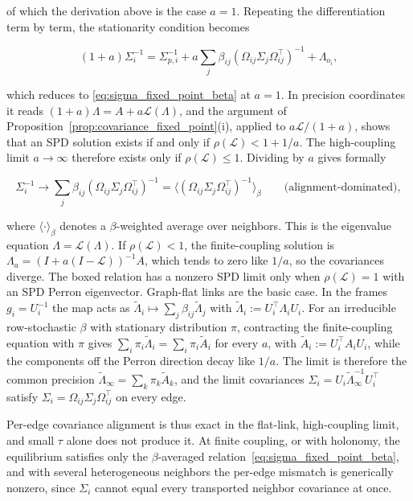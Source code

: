 \documentclass[11pt]{article}
\begin{document}
of which the derivation above is the case $a = 1$. Repeating the differentiation term by term, the stationarity condition becomes

\begin{equation}
(1 + a)\Sigma_i^{-1}
=\Sigma_{p,i}^{-1}
+ a \sum_j \beta_{ij}
(\Omega_{ij}\Sigma_j\Omega_{ij}^\top)^{-1}
+ \Lambda_{o_i},
\end{equation}

which reduces to \eqref{eq:sigma_fixed_point_beta} at $a = 1$. In precision coordinates it reads $(1+a)\Lambda = A + a\mathcal{L}(\Lambda)$, and the argument of Proposition~\ref{prop:covariance_fixed_point}(i), applied to $a\mathcal{L}/(1+a)$, shows that an SPD solution exists if and only if $\rho(\mathcal{L}) < 1 + 1/a$. The high-coupling limit $a \to \infty$ therefore exists only if $\rho(\mathcal{L}) \leq 1$. Dividing by $a$ gives formally

\begin{equation}
\boxed{
\Sigma_i^{-1}
\longrightarrow
\sum_j \beta_{ij}
(\Omega_{ij}\Sigma_j\Omega_{ij}^\top)^{-1}
=\big\langle(\Omega_{ij}\Sigma_j\Omega_{ij}^\top)^{-1}
\big\rangle_{\beta}
\qquad \text{(alignment-dominated)},}
\label{eq:beta_weighted_precision}
\end{equation}

where $\langle \cdot \rangle_{\beta}$ denotes a $\beta$-weighted average over neighbors. This is the eigenvalue equation $\Lambda = \mathcal{L}(\Lambda)$. If $\rho(\mathcal{L}) < 1$, the finite-coupling solution is $\Lambda_a = (I + a(I - \mathcal{L}))^{-1}A$, which tends to zero like $1/a$, so the covariances diverge. The boxed relation has a nonzero SPD limit only when $\rho(\mathcal{L}) = 1$ with an SPD Perron eigenvector. Graph-flat links are the basic case. In the frames $g_i = U_i^{-1}$ the map acts as $\tilde\Lambda_i \mapsto \sum_j\beta_{ij}\tilde\Lambda_j$ with $\tilde\Lambda_i := U_i^\top\Lambda_iU_i$. For an irreducible row-stochastic $\beta$ with stationary distribution $\pi$, contracting the finite-coupling equation with $\pi$ gives $\sum_i\pi_i\tilde\Lambda_i = \sum_i\pi_i\tilde A_i$ for every $a$, with $\tilde A_i := U_i^\top A_iU_i$, while the components off the Perron direction decay like $1/a$. The limit is therefore the common precision $\tilde\Lambda_\infty = \sum_k\pi_k\tilde A_k$, and the limit covariances $\Sigma_i = U_i\tilde\Lambda_\infty^{-1}U_i^\top$ satisfy $\Sigma_i = \Omega_{ij}\Sigma_j\Omega_{ij}^\top$ on every edge.

Per-edge covariance alignment is thus exact in the flat-link, high-coupling limit, and small $\tau$ alone does not produce it. At finite coupling, or with holonomy, the equilibrium satisfies only the $\beta$-averaged relation~\eqref{eq:sigma_fixed_point_beta}, and with several heterogeneous neighbors the per-edge mismatch is generically nonzero, since $\Sigma_i$ cannot equal every transported neighbor covariance at once.
\end{document}
